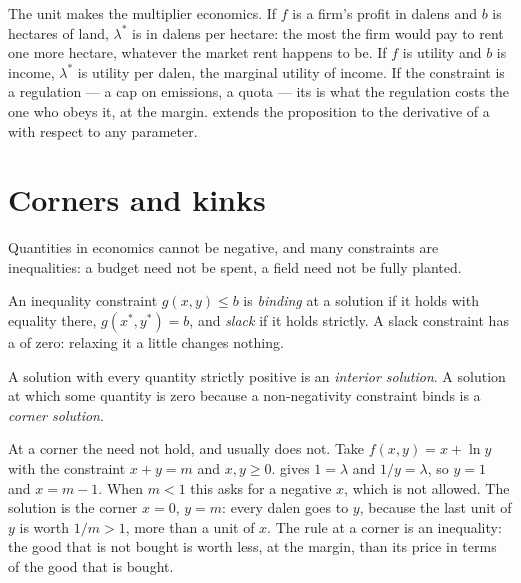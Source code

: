 The unit makes the multiplier economics. If $f$ is a firm's profit in
dalens and $b$ is hectares of land, $\lambda^*$ is in dalens per hectare: the
most the firm would pay to rent one more hectare, whatever the market rent
happens to be. If $f$ is utility and $b$ is income, $\lambda^*$ is utility
per dalen, the marginal utility of income. If the constraint is a
regulation --- a cap on emissions, a quota --- its  is what the
regulation costs the one who obeys it, at the margin.
 extends the proposition to the derivative
of a  with respect to any parameter.

\section{Corners and kinks}\label{sec:b1:constrained-optimisation:corners}

Quantities in economics cannot be negative, and many constraints are
inequalities: a budget need not be spent, a field need not be fully
planted.

\begin{definition}\label{def:b1:constrained-optimisation:binding}
An inequality constraint $g(x, y) \le b$ is \emph{binding} at a solution if
it holds with equality there, $g(x^*, y^*) = b$, and \emph{slack} if it
holds strictly. A slack constraint has a  of zero: relaxing it a
little changes nothing.
\end{definition}

\begin{definition}\label{def:b1:constrained-optimisation:corner}
A solution with every quantity strictly positive is an \emph{interior
solution}. A solution at which some quantity is zero because a
non-negativity constraint binds is a \emph{corner solution}.
\end{definition}

At a corner the  need not hold, and usually does not.
Take $f(x, y) = x + \ln y$ with the constraint $x + y = m$ and $x, y \ge 0$.
 gives $1 = \lambda$ and $1/y = \lambda$, so $y = 1$ and
$x = m - 1$. When $m < 1$ this asks for a negative $x$, which is not
allowed. The solution is the corner $x = 0$, $y = m$: every dalen goes to $y$,
because the last unit of $y$ is worth $1/m > 1$, more than a unit of $x$.
The rule at a corner is an inequality: the good that is not bought is worth
less, at the margin, than its price in terms of the good that is bought.

